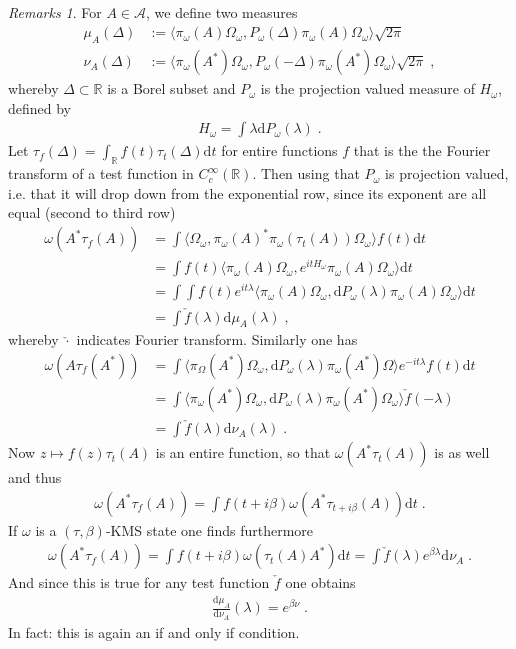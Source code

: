 \documentclass[
a4paper, %
11pt, %
onecolumn, %
openany, %
]{memoir}
\theoremstyle{definition}
\theoremstyle{remark}
\newtheorem{remarks}[definition]{Remarks}
\theoremstyle{plain}
\begin{document}
\begin{remarks}
	For $A\in\mathcal{A}$, we define two measures\begin{align}
	\mu_A(\Delta)&:=\langle\pi_{\omega}(A)\Omega_{\omega},P_{\omega}(\Delta)\pi_{\omega}(A)\Omega_{\omega}\rangle \sqrt{2\pi}\\
	\nu_A(\Delta)&:=\langle \pi_{\omega}(A^*)\Omega_{\omega},P_{\omega}(-\Delta)\pi_{\omega}(A^*)\Omega_{\omega}\rangle \sqrt{2\pi}	\; ,
	\end{align}
whereby $\Delta\subset\mathbb{R}$ is a Borel subset and $P_{\omega}$ is the projection valued measure of $H_{\omega}$, defined by \begin{align}
H_{\omega}=\int\lambda \mathrm{d}P_{\omega}(\lambda)\; .
\end{align}
Let $\tau_f(\Delta)=\int_{\mathbb{R}}f(t)\tau_t(\Delta)\mathrm{d}t$ for entire functions $f$ that is the the Fourier transform of a test function in $C_c^{\infty}(\mathbb{R})$. Then using that $P_{\omega}$ is projection valued, i.e. that it will drop down from the exponential row, since its exponent are all equal (second to third row)\begin{align}
\omega(A^*\tau_f(A))&=\int\langle \Omega_{\omega},\pi_{\omega}(A)^*\pi_{\omega}(\tau_t(A))\Omega_{\omega}\rangle f(t)\mathrm{d}t\\
&=\int f(t)\langle \pi_{\omega}(A)\Omega_{\omega},e^{itH_{\omega}}\pi_{\omega}(A)\Omega_{\omega}\rangle\mathrm{d}t\\
&=\int\int f(t)e^{it\lambda}\langle\pi_{\omega}(A)\Omega_{\omega},\mathrm{d}P_{\omega}(\lambda)\pi_{\omega}(A)\Omega_{\omega}\rangle\mathrm{d}t\\
&=\int \check{f}(\lambda)\mathrm{d}\mu_{A}(\lambda)\;,
\end{align}
whereby $\check{\cdot}$ indicates Fourier transform. Similarly one has \begin{align}
\omega(A\tau_f(A^*))&=\int \langle \pi_{\Omega}(A^*)\Omega_{\omega},\mathrm{d}P_{\omega}(\lambda)\pi_{\omega}(A^*)\Omega\rangle e^{-it\lambda}f(t)\mathrm{d}t\\
&=\int \langle \pi_{\omega}(A^*)\Omega_{\omega},\mathrm{d}P_{\omega}(\lambda) \pi_{\omega}(A^*)\Omega_{\omega}\rangle\check{f}(-\lambda)\\
&=\int \check{f}(\lambda)\mathrm{d}\nu_A(\lambda)\; .
\end{align}
Now $z\mapsto f(z)\tau_t(A)$ is an entire function, so that $\omega(A^*\tau_t(A))$ is as well and thus \begin{align}
\omega(A^*\tau_f(A))=\int f(t+i\beta)\omega(A^*\tau_{t+i\beta}(A))\mathrm{d}t\; .
\end{align}
If $\omega$ is a $(\tau,\beta)$-KMS state one finds furthermore \begin{align}
\omega(A^*\tau_f(A))=\int f(t+i\beta)\omega(\tau_t(A)A^*)\mathrm{d}t=\int\check{f}(\lambda)e^{\beta \lambda}\mathrm{d}\nu_A\; .
\end{align}
And since this is true for any test function $\check{f}$ one obtains \begin{align}
\frac{\mathrm{d}\mu_{A}}{\mathrm{d}\nu_{A}}(\lambda)=e^{\beta\nu}\; .\label{eqn::measure_iff_kms}
\end{align}
In fact: this is again an if and only if condition. \end{remarks}
\end{document}
